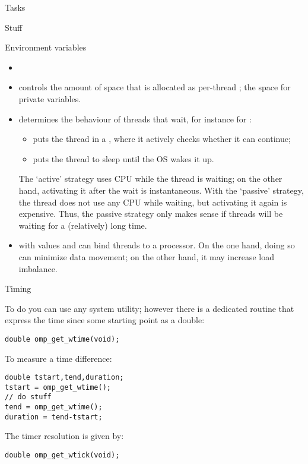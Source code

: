 {Tasks}

 {Stuff}

 {Environment variables}
\begin{itemize}
\item {}
\item {} controls the amount of space that is
  allocated as per-thread ; the space for private
  variables.
\item {} determines the behaviour of
  threads that wait, for instance for :
  \begin{itemize}
  \item {} puts the thread in a , where
    it actively checks whether it can continue;
  \item {} puts the thread to sleep until the \ac{OS} wakes
    it up.
  \end{itemize}
  The `active' strategy uses CPU while the thread is waiting; on the
  other hand, activating it after the wait is instantaneous. With the
  `passive' strategy, the thread does not use any CPU while waiting,
  but activating it again is expensive. Thus, the passive strategy
  only makes sense if threads will be waiting for a (relatively) long
  time.
\item {} with values  and 
  can bind threads to a processor. On the one hand, doing so can
  minimize data movement; on the other hand, it may increase load
  imbalance.
\end{itemize}

 {Timing}

To do  you can use any system utility;
however there is a dedicated routine 
that express the time since some starting point as a double:
\begin{verbatim}
double omp_get_wtime(void);
\end{verbatim}
To measure a time difference:
\begin{verbatim}
double tstart,tend,duration;
tstart = omp_get_wtime();
// do stuff
tend = omp_get_wtime();
duration = tend-tstart;
\end{verbatim}
The timer resolution is given by:
\begin{verbatim}
double omp_get_wtick(void);
\end{verbatim}

